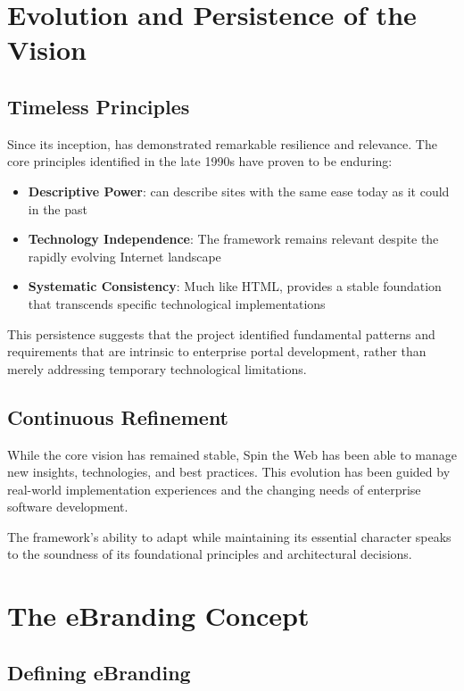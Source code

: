 \section{Evolution and Persistence of the Vision}

\subsection{Timeless Principles}

Since its inception, \wbol{} has demonstrated remarkable resilience and relevance. The core principles identified in the late 1990s have proven to be enduring:

\begin{itemize}
\item \textbf{Descriptive Power}: \wbol{} can describe sites with the same ease today as it could in the past
\item \textbf{Technology Independence}: The framework remains relevant despite the rapidly evolving Internet landscape
\item \textbf{Systematic Consistency}: Much like HTML, \wbol{} provides a stable foundation that transcends specific technological implementations
\end{itemize}

This persistence suggests that the project identified fundamental patterns and requirements that are intrinsic to enterprise portal development, rather than merely addressing temporary technological limitations.

\subsection{Continuous Refinement}

While the core vision has remained stable, Spin the Web has been able to manage new insights, technologies, and best practices. This evolution has been guided by real-world implementation experiences and the changing needs of enterprise software development.

The framework's ability to adapt while maintaining its essential character speaks to the soundness of its foundational principles and architectural decisions.

\section{The eBranding Concept}

\subsection{Defining eBranding}

